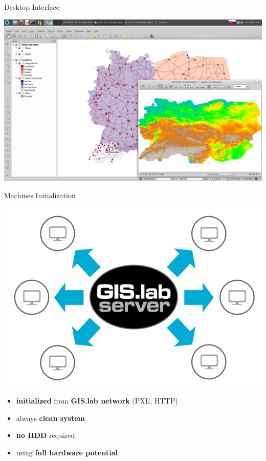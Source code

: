 \documentclass[12pt]{beamer}
\begin{document}
\begin{frame}[plain]{Desktop Interface}
	\begin{center}
		\includegraphics[keepaspectratio=true,width=\textwidth]{images/gislab-desktop-2.png}
	\end{center}
\end{frame}

\begin{frame}{Machines Initialization}
	\begin{center}
		\includegraphics[keepaspectratio=true,height=0.4\textheight]{images/gislab-machines-launch.png}
	\end{center}
	\begin{itemize}
		\item \textbf{initialized} from \textbf{GIS.lab network} (PXE, HTTP)
		\item always \textbf{clean system}
		\item \textbf{no HDD} required
		\item using \textbf{full hardware potential}
	\end{itemize}
\end{frame}
\end{document}
